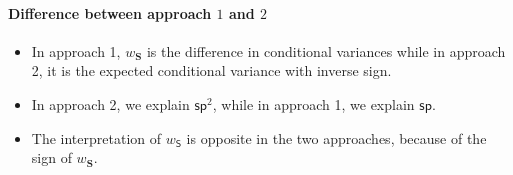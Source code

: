 \begin{comment}
	\textit{ An alternate} is to further decompose $ \mathsf{Var}[\hat{Y}] $ and include in $ w_{\mathbf{S}} $. 
	
	\begin{align*}
		\frac{1}{2^2}\mathsf{sp}^2 &= \mathsf{Var}[\hat{Y}] -  \sum_{\mathbf{S} \subseteq [\numnonsensitive] \setminus \emptyset} \sum_{\mathbf{a} \in \{\mathbf{a}, \mathbf{a}'\}} \Pr[\sensitive=\mathbf{a}]V_{\mathbf{S}}^{(\mathbf{a})} \\ 
		&= \sum_{\mathbf{S} \subseteq [\numnonsensitive] \setminus \emptyset} \Big(V_{\mathbf{S}}  - 
		\sum_{\mathbf{a} \in \{\mathbf{a}, \mathbf{a}'\}} \Pr[\sensitive=\mathbf{a}]V_{\mathbf{S}}^{(\mathbf{a})} \Big) \\ 
	\end{align*}
	
	In that case, we compute $ w_{\mathbf{S}} $ as follows:
	
	\[
	w_{\mathbf{S}} = V_{\mathbf{S}}  - 
	\sum_{\mathbf{a} \in \{\mathbf{a}, \mathbf{a}'\}} \Pr[\sensitive=\mathbf{a}]V_{\mathbf{S}}^{(\mathbf{a})}
	\]
	
	
	\red{Update:}
	\begin{itemize}
		\item In current implementation, $ w_\mathbf{S} $ becomes $ 0 $ for each \textit{individual} features (when $ |\mathbf{S}| $ = 1) .  
	\end{itemize}
\end{comment}


\paragraph{Difference between approach $ 1 $ and $ 2 $}
\begin{itemize}
	\item In approach 1, $ w_{\mathbf{S}} $ is the difference in conditional variances while in approach 2, it is the expected conditional variance with inverse sign.
	\item In approach 2, we explain $ \mathsf{sp}^2 $, while in approach 1, we explain $ \mathsf{sp} $. 
	\item The interpretation of $ w_{\mathsf{S}} $ is opposite in the two approaches, because of the sign of $ w_{\mathbf{S}} $. 
\end{itemize}




